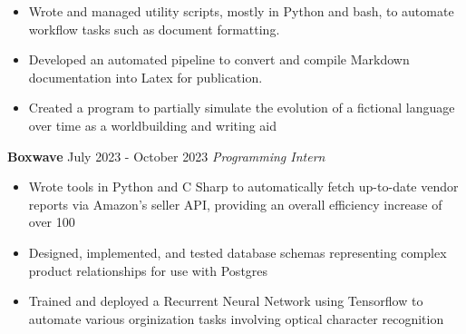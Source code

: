 \documentclass[11pt]{article}
\begin{document}
\begin{paracol}{2}
{\begin{itemize}
            
              
                  \item Wrote and managed utility scripts, mostly in Python and bash, to automate workflow tasks such as document formatting.
                
                  \item Developed an automated pipeline to convert and compile Markdown documentation into Latex for publication.
                
                  \item Created a program to partially simulate the evolution of a fictional language over time as a worldbuilding and writing aid
                
            
      \end{itemize}
      
        
    

        
        
        

        
          
        


        \begingroup
      \textbf{ Boxwave }\hfill\color{black!70}\small{ July 2023 - October 2023 }
        \endgroup
        \textit{ Programming Intern }

        
      \begin{itemize}

        
            
              
                  \item Wrote tools in Python and C Sharp to automatically fetch up-to-date vendor reports via Amazon's seller API, providing an overall efficiency increase of over 100%
                
                  \item Designed, implemented, and tested database schemas representing complex product relationships for use with Postgres
                
                  \item Trained and deployed a Recurrent Neural Network using Tensorflow to automate various orginization tasks involving optical character recognition
                
            
      \end{itemize}
      
        
        }





\end{paracol}
\end{document}
